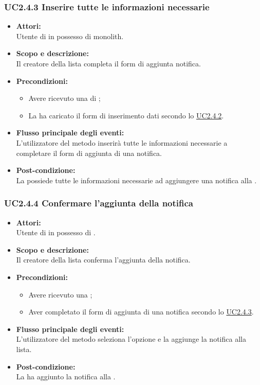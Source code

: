 \subsubsection{UC2.4.3 Inserire tutte le informazioni necessarie} \label{UC2.4.3}

\begin{itemize}
	\item \textbf{Attori:}
	\\Utente di  in possesso di monolith.
	\item \textbf{Scopo e descrizione:} 
	\\Il creatore della lista completa il form di aggiunta notifica.
	\item \textbf{Precondizioni:}
	\begin{itemize}
		\item Avere ricevuto una  di ;
		\item La  ha caricato il form di inserimento dati secondo lo \hyperref[UC2.4.2]{UC2.4.2}.
	\end{itemize}
	\item \textbf{Flusso principale degli eventi:}
	\\L'utilizzatore del metodo inserirà tutte le informazioni necessarie a completare il form di aggiunta di una notifica.
	\item \textbf{Post-condizione:}
	\\La {} possiede tutte le informazioni necessarie ad aggiungere una notifica alla .
\end{itemize}

\subsubsection{UC2.4.4 Confermare l'aggiunta della notifica} \label{UC2.4.4}

\begin{itemize}
	\item \textbf{Attori:}
	\\Utente di  in possesso di \ProjectName{}.
	\item \textbf{Scopo e descrizione:} 
	\\Il creatore della lista conferma l'aggiunta della notifica.
	\item \textbf{Precondizioni:}
	\begin{itemize}
		\item Avere ricevuto una  ;
		\item Aver completato il form di aggiunta di una notifica secondo lo \hyperref[UC2.4.3]{UC2.4.3}.
	\end{itemize}
	\item \textbf{Flusso principale degli eventi:}
	\\L'utilizzatore del metodo seleziona l'opzione  e la  aggiunge la notifica alla lista.
	\item \textbf{Post-condizione:}
	\\La {} ha aggiunto la notifica alla .
\end{itemize}

